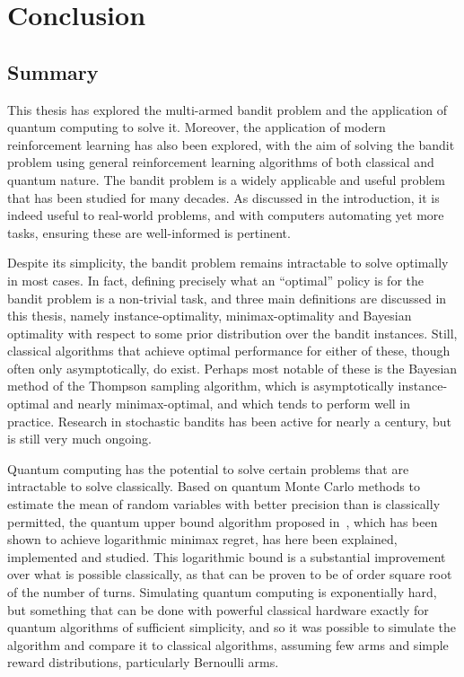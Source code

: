\chapter{Conclusion}
\label{chap:final}

\section{Summary}
This thesis has explored the multi-armed bandit problem and the application of quantum computing to solve it.
Moreover, the application of modern reinforcement learning has also been explored, with the aim of solving the bandit problem using general reinforcement learning algorithms of both classical and quantum nature.
The bandit problem is a widely applicable and useful problem that has been studied for many decades.
As discussed in the introduction, it is indeed useful to real-world problems, and with computers automating yet more tasks, ensuring these are well-informed is pertinent.

Despite its simplicity, the bandit problem remains intractable to solve optimally in most cases.
In fact, defining precisely what an \enquote{optimal} policy is for the bandit problem is a non-trivial task, and three main definitions are discussed in this thesis, namely instance-optimality, minimax-optimality and Bayesian optimality with respect to some prior distribution over the bandit instances.
Still, classical algorithms that achieve optimal performance for either of these, though often only asymptotically, do exist.
Perhaps most notable of these is the Bayesian method of the Thompson sampling algorithm, which is asymptotically instance-optimal and nearly minimax-optimal, and which tends to perform well in practice.
Research in stochastic bandits has been active for nearly a century, but is still very much ongoing.

Quantum computing has the potential to solve certain problems that are intractable to solve classically.
Based on quantum Monte Carlo methods to estimate the mean of random variables with better precision than is classically permitted, the quantum upper bound algorithm proposed in~\autocite{wan2022}, which has been shown to achieve logarithmic minimax regret, has here been explained, implemented and studied.
This logarithmic bound is a substantial improvement over what is possible classically, as that can be proven to be of order square root of the number of turns.
Simulating quantum computing is exponentially hard, but something that can be done with powerful classical hardware exactly for quantum algorithms of sufficient simplicity, and so it was possible to simulate the algorithm and compare it to classical algorithms, assuming few arms and simple reward distributions, particularly Bernoulli arms.

